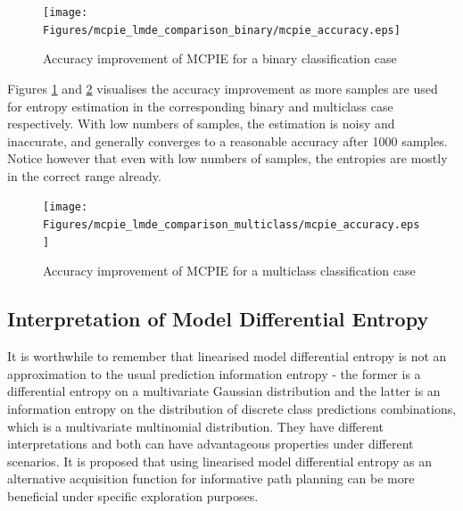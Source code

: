 			\begin{figure}[!htbp]
				\centering
					\texttt{[image: Figures/mcpie\_lmde\_comparison\_binary/mcpie\_accuracy.eps]}
				\caption{Accuracy improvement of MCPIE for a binary classification case}
				\label{Figure:mcpie_accuracy_binary}
			\end{figure}
				
			Figures \ref{Figure:mcpie_accuracy_binary} and \ref{Figure:mcpie_accuracy_multiclass} visualises the accuracy improvement as more samples are used for entropy estimation in the corresponding binary and multiclass case respectively. With low numbers of samples, the estimation is noisy and inaccurate, and generally converges to a reasonable accuracy after 1000 samples. Notice however that even with low numbers of samples, the entropies are mostly in the correct range already.
			
			\begin{figure}[!htbp]
				\centering
					\texttt{[image: Figures/mcpie\_lmde\_comparison\_multiclass/mcpie\_accuracy.eps]}
				\caption{Accuracy improvement of MCPIE for a multiclass classification case}
				\label{Figure:mcpie_accuracy_multiclass}
			\end{figure}
			
		\subsection{Interpretation of Model Differential Entropy}
		\label{InformativeSeafloorExploration:LMDE:Interpretation}
		
			It is worthwhile to remember that linearised model differential entropy is not an approximation to the usual prediction information entropy - the former is a differential entropy on a multivariate Gaussian distribution and the latter is an information entropy on the distribution of discrete class predictions combinations, which is a multivariate multinomial distribution. They have different interpretations and both can have advantageous properties under different scenarios. It is proposed that using linearised model differential entropy as an alternative acquisition function for informative path planning can be more beneficial under specific exploration purposes.
			
